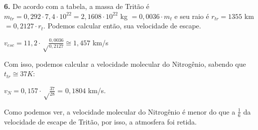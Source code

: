 \documentclass[12pt,letterpaper]{article}
\begin{document}
	    \textbf{6.} De acordo com a tabela, a massa de Tritão é
	    $m_{tr} = 0,292 \cdot 7,4 \cdot 10^{22} = 2,1608 \cdot 10^{22}$ kg $ = 0,0036 \cdot m_t$ e seu raio é $r_{tr} = 1355$ km $= 0,2127 \cdot r_t$.
	    Podemos calcular então, sua velocidade de escape.
	    \begin{center}
	    	 $v_{esc} = 11,2 \cdot \sqrt \frac{0,0036}{0,2127} \cong 1,457$ km/s
	    \end{center}
	    Com isso, podemos calcular a velocidade molecular do Nitrogênio, sabendo que $t_{tr} \cong 37 K$:
	    \begin{center}
		    $v_N = 0,157 \cdot \sqrt\frac{37}{28}$ = $0,1804$ km/s.
	    \end{center}
	    Como podemos ver, a velocidade molecular do Nitrogênio é menor do que a $\frac{1}{6}$ da velocidade de escape de Tritão, por isso, a atmosfera foi retida. 	    
			 
\end{document}
